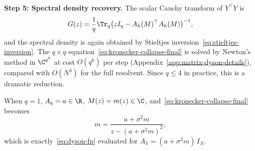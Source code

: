 \medskip
\noindent\textbf{Step 5: Spectral density recovery.}
The scalar Cauchy transform of $Y^\top Y$ is
\[
G(z) = \frac{1}{q}\Tr_q\bigl(zI_q - A_h(M)^\top A_h(M)\bigr)^{-1},
\]
and the spectral density is again obtained by Stieltjes inversion~\eqref{eq:stieltjes-inversion}. The $q \times q$ equation~\eqref{eq:kronecker-collapse-final} is solved by Newton's method in $\C^{q^2}$ at cost $O(q^6)$ per step (Appendix~\ref{app:matrix-dyson-details}), compared with $O(N^3)$ for the full resolvent. Since $q \leq 4$ in practice, this is a dramatic reduction.

\begin{remark}[Verification: $q = 1$ recovery]
When $q = 1$, $A_q = a \in \R$, $M(z) = m(z) \in \C$, and~\eqref{eq:kronecker-collapse-final} becomes
\[
m = \frac{a + \sigma^2 m}{z - (a + \sigma^2 m)^2},
\]
which is exactly~\eqref{eq:dyson-fp} evaluated for $A_h = (a + \sigma^2 m)\,I_N$.
\end{remark}